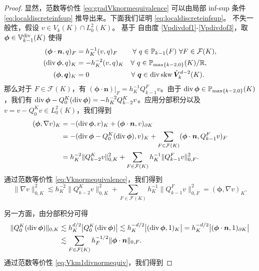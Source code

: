 \begin{proof}
显然，范数等价性 \eqref{eq:gradVknormequivalence} 可以由局部 inf-sup 条件
\eqref{eq:localdiscreteinfsup} 推导出来。下面我们证明
\eqref{eq:localdiscreteinfsup}。
不失一般性，假设 $v\in V_k(K)\cap L_0^2(K)$。
基于 自由度 \eqref{Vpdivdof1}-\eqref{Vpdivdof3}，取 $\boldsymbol{\phi}\in\mathbb{V}_{k-1}^{\rm div}(K)$ 使得
\begin{align*}
(\boldsymbol{\phi}\cdot\boldsymbol{n}, q)_F&=h_K^{-1}(v, q)_F
\quad\quad\,\forall~q\in\mathbb P_{k-1}(F) \ \forall  F\in\mathcal F(K), \\
(\operatorname{div}\boldsymbol{\phi}, q)_K&=-h_K^{-2}(v, q)_K  \quad\forall~q\in\mathbb P_{\max\{k-2,0\}}(K)/\mathbb R, \\
(\boldsymbol{\phi}, \boldsymbol{q})_K&=0  \qquad\qquad\qquad\forall~\boldsymbol{q}\in \operatorname{div}\operatorname{skw}\mathring{\boldsymbol{V}}_{k}^{d-2}(K). 
\end{align*}
那么对于 $F\in\mathcal F(K)$，有
$(\boldsymbol{\phi}\cdot\boldsymbol{n})|_{F}=h_K^{-1}Q_{k-1}^Fv$。由于
$\operatorname{div}\boldsymbol{\phi}\in \mathbb P_{\max\{k-2,0\}}(K)$，我们有
$\operatorname{div}\boldsymbol{\phi}-Q_{0}^K(\operatorname{div}\boldsymbol{\phi})=-h_K^{-2}Q_{k-2}^Kv$。应用分部积分以及
$v=v-Q_{0}^Kv\in L_0^2(K)$，我们得到
\begin{align*}
(\boldsymbol{\phi}, \nabla v)_K&=-(\operatorname{div}\boldsymbol{\phi}, v)_K + (\boldsymbol{\phi}\cdot\boldsymbol{n}, v)_{\partial K} \\
&=-(\operatorname{div}\boldsymbol{\phi}-Q_{0}^K(\operatorname{div}\boldsymbol{\phi}), v)_K+\sum_{F\in\mathcal F(K)}(\boldsymbol{\phi}\cdot\boldsymbol{n}, Q_{k-1}^Fv)_{F} \\
&=h_K^{-2}\|Q_{k-2}^Kv\|_{0,K}^2+\sum_{F\in\mathcal F(K)}h_K^{-1}\|Q_{k-1}^Fv\|_{0,F}^2.
\end{align*}
通过范数等价性 \eqref{eq:Vknormequivalence}，我们得到
\begin{equation}\label{eq:20220204}
\|\nabla v\|_{0,K}^{2}\lesssim h_K^{-2}\|Q_{k-2}^Kv\|_{0,K}^2+\sum_{F\in\mathcal F(K)}h_K^{-1}\|Q_{k-1}^Fv\|_{0,F}^2= (\boldsymbol{\phi}, \nabla v)_K.
\end{equation}

另一方面，由分部积分可得
\begin{align*}
\|Q_0^K(\operatorname{div}\boldsymbol{\phi})\|_{0,K}&\lesssim h_{
K}^{d/2}\big|Q_0^K(\operatorname{div}\boldsymbol{\phi})\big|\lesssim h_{K}^{-d/2}\big|(\operatorname{div}\boldsymbol{\phi},1)_{K}\big|=h_{K}^{-d/2}\big|(\boldsymbol{\phi}\cdot\boldsymbol{n},1)_{\partial K}\big| \\
&\lesssim \sum_{F\in\mathcal F(K)}h_F^{-1/2}\|\boldsymbol{\phi}\cdot\boldsymbol{n}\|_{0,F}.
\end{align*}
通过范数等价性 \eqref{eq:Vkm1divnormequiv}，我们得到


\end{proof}
